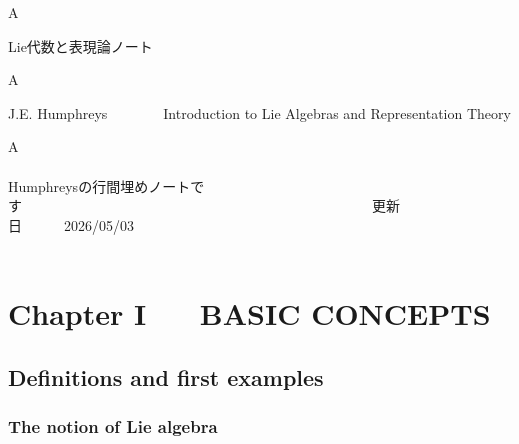 \documentclass[uplatex,dvipdfmx]{jsarticle}
\begin{document}
\color{white}A\color{black}\\
\begin{center}
  {\huge Lie代数と表現論ノート}
\end{center}
\color{white}A\color{black}
\begin{center}
  {\Large J.E. Humphreys~~~~~~~~Introduction to Lie Algebras and Representation Theory}
\end{center}
\color{white}A\color{black}\\\\
Humphreysの行間埋めノートです~~~~~~~~~~~~~~~~~~~~~~~~~~~~~~~~~~~~~~~~~~~~~~~~~~更新日~~~~~~2026/05/03
\\\\
\hypertarget{toc}{}\tableofcontents
\newpage

\section{Chapter I ~~ BASIC CONCEPTS}
\subsection{Definitions and first examples}
\subsubsection{The notion of Lie algebra}
\end{document}
